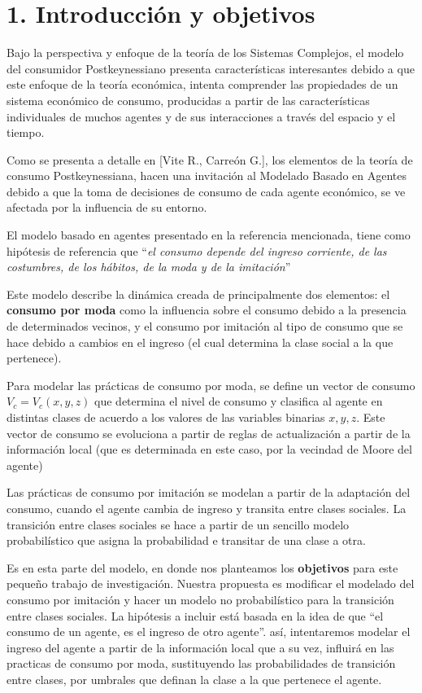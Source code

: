 \documentclass[letterpaper,12pt]{article}
\begin{document}
 
\section*{1. Introducción y objetivos}

Bajo la perspectiva y enfoque de la teoría de los Sistemas Complejos, el modelo del consumidor Postkeynessiano  presenta características interesantes debido a que este enfoque de la teoría económica, intenta comprender las propiedades de un sistema económico de consumo, producidas a partir de las características individuales de muchos agentes y de sus interacciones a través del espacio y el tiempo.

Como se presenta a detalle en [Vite R., Carreón G.], los elementos de la teoría de consumo Postkeynessiana, hacen una invitación al Modelado Basado en Agentes debido a que la toma de decisiones de consumo de cada agente económico, se ve afectada por la influencia de su entorno.

El modelo basado en agentes  presentado en la referencia mencionada, tiene como hipótesis de referencia que ``\textit{el consumo depende del ingreso corriente, de las costumbres, de los hábitos, de la moda y de la imitación}''

Este modelo describe la dinámica creada de principalmente dos elementos: el \textbf{consumo por moda} como la influencia sobre el consumo debido a la presencia  de determinados vecinos, y el consumo por imitación al tipo de consumo que se hace debido a cambios en el ingreso (el cual determina la clase social a la que pertenece).

Para modelar las prácticas de consumo por moda, se define un vector de consumo $V_c=V_c(x,y,z)$ que determina el nivel de consumo y clasifica al agente en distintas clases de acuerdo a los valores de las variables binarias $x,y,z$. Este vector de consumo se evoluciona a partir de reglas de actualización a partir de la información local (que es determinada en este caso, por la vecindad de Moore del agente)

Las prácticas de consumo por imitación se modelan a partir de la adaptación del consumo, cuando el agente cambia de ingreso y transita entre clases sociales.  La transición entre clases sociales se hace a partir de un sencillo modelo probabilístico que asigna la probabilidad e transitar de una clase a otra.

Es en esta parte del modelo, en donde nos planteamos los \textbf{objetivos} para este pequeño trabajo de investigación. Nuestra propuesta es modificar el modelado del consumo por imitación y hacer un modelo no probabilístico para la transición entre clases sociales. La hipótesis a incluir está basada en la idea de que ``el consumo de un agente, es el ingreso de otro agente''. así,  intentaremos modelar el ingreso del agente a  partir de la información local que a su vez, influirá en las practicas de consumo por moda, sustituyendo las probabilidades de transición entre clases, por umbrales que definan la clase a la que pertenece el agente. 
\end{document}
